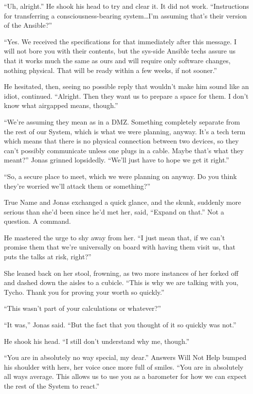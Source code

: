 ``Uh, alright.'' He shook his head to try and clear it. It did not work. ``Instructions for transferring a consciousness-bearing system\ldots I'm assuming that's their version of the Ansible?''

``Yes. We received the specifications for that immediately after this message. I will not bore you with their contents, but the sys-side Ansible techs assure us that it works much the same as ours and will require only software changes, nothing physical. That will be ready within a few weeks, if not sooner.''

He hesitated, then, seeing no possible reply that wouldn't make him sound like an idiot, continued. ``Alright. Then they want us to prepare a space for them. I don't know what airgapped means, though.''

``We're assuming they mean as in a DMZ. Something completely separate from the rest of our System, which is what we were planning, anyway. It's a tech term which means that there is no physical connection between two devices, so they can't possibly communicate unless one plugs in a cable. Maybe that's what they meant?'' Jonas grinned lopsidedly. ``We'll just have to hope we get it right.''

``So, a secure place to meet, which we were planning on anyway. Do you think they're worried we'll attack them or something?''

True Name and Jonas exchanged a quick glance, and the skunk, suddenly more serious than she'd been since he'd met her, said, ``Expand on that.'' Not a question. A command.

He mastered the urge to shy away from her. ``I just mean that, if we can't promise them that we're universally on board with having them visit us, that puts the talks at risk, right?''

She leaned back on her stool, frowning, as two more instances of her forked off and dashed down the aisles to a cubicle. ``This is why we are talking with you, Tycho. Thank you for proving your worth so quickly.''

``This wasn't part of your calculations or whatever?''

``It was,'' Jonas said. ``But the fact that you thought of it so quickly was not.''

He shook his head. ``I still don't understand why me, though.''

``You are in absolutely no way special, my dear.'' Answers Will Not Help bumped his shoulder with hers, her voice once more full of smiles. ``You are in absolutely all ways average. This allows us to use you as a barometer for how we can expect the rest of the System to react.''

